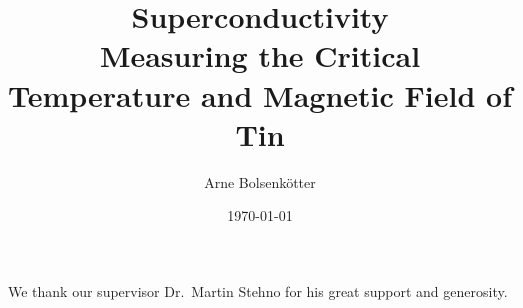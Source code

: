 \documentclass[%
a4paper,
reprint, %
superscriptaddress,
aps,
prb,
]{revtex4-2}
\begin{document}

\title{Superconductivity\texorpdfstring{\\}{PDFstring}Measuring the Critical Temperature and Magnetic Field of Tin}


\author{Arne Bolsenkötter}

\date{\today}

\begin{abstract}
    
\end{abstract}

\maketitle


% 
% 
% 
% 
% 

\begin{acknowledgements}
We thank our supervisor Dr.\ Martin Stehno for his great support and generosity.
\end{acknowledgements}

\appendix

\nocite{*}  %

\end{document}
